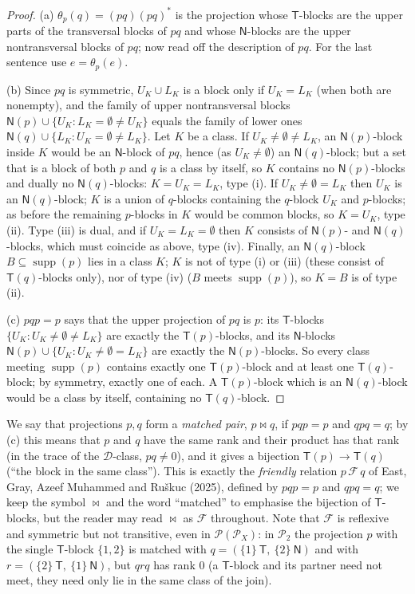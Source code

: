 \documentclass[11pt]{amsart}
\theoremstyle{definition}
\newcommand{\D}{\mathcal{D}}
\renewcommand{\P}{\mathcal{P}}
\newcommand{\supp}{\operatorname{supp}}
\newcommand{\T}{\mathsf{T}}
\newcommand{\N}{\mathsf{N}}
\begin{document}
\begin{proof}
(a) $\theta_p(q)=(pq)(pq)^*$ is the projection whose $\T$-blocks are the upper parts of the transversal blocks of $pq$ and whose $\N$-blocks are the upper nontransversal blocks of $pq$; now read off the description of $pq$. For the last sentence use $e=\theta_p(e)$.

(b) Since $pq$ is symmetric, $U_K\cup L_K$ is a block only if $U_K=L_K$ (when both are nonempty), and the family of upper nontransversal blocks $\N(p)\cup\{U_K:L_K=\emptyset\ne U_K\}$ equals the family of lower ones $\N(q)\cup\{L_K:U_K=\emptyset\ne L_K\}$. Let $K$ be a class. If $U_K\ne\emptyset\ne L_K$, an $\N(p)$-block inside $K$ would be an $\N$-block of $pq$, hence (as $U_K\neq\emptyset$) an $\N(q)$-block; but a set that is a block of both $p$ and $q$ is a class by itself, so $K$ contains no $\N(p)$-blocks and dually no $\N(q)$-blocks: $K=U_K=L_K$, type (i). If $U_K\ne\emptyset=L_K$ then $U_K$ is an $\N(q)$-block; $K$ is a union of $q$-blocks containing the $q$-block $U_K$ and $p$-blocks; as before the remaining $p$-blocks in $K$ would be common blocks, so $K=U_K$, type (ii). Type (iii) is dual, and if $U_K=L_K=\emptyset$ then $K$ consists of $\N(p)$- and $\N(q)$-blocks, which must coincide as above, type (iv). Finally, an $\N(q)$-block $B\subseteq\supp(p)$ lies in a class $K$; $K$ is not of type (i) or (iii) (these consist of $\T(q)$-blocks only), nor of type (iv) ($B$ meets $\supp(p)$), so $K=B$ is of type (ii).

(c) $pqp=p$ says that the upper projection of $pq$ is $p$: its $\T$-blocks $\{U_K: U_K\ne\emptyset\ne L_K\}$ are exactly the $\T(p)$-blocks, and its $\N$-blocks $\N(p)\cup\{U_K:U_K\ne\emptyset=L_K\}$ are exactly the $\N(p)$-blocks. So every class meeting $\supp(p)$ contains exactly one $\T(p)$-block and at least one $\T(q)$-block; by symmetry, exactly one of each. A $\T(p)$-block which is an $\N(q)$-block would be a class by itself, containing no $\T(q)$-block.
\end{proof}

We say that projections $p,q$ form a \emph{matched pair}, $p\bowtie q$, if $pqp=p$ and $qpq=q$; by (c) this means that $p$ and $q$ have the same rank and their product has that rank (in the trace of the $\D$-class, $pq\ne0$), and it gives a bijection $\T(p)\to\T(q)$ (``the block in the same class''). This is exactly the \emph{friendly} relation $p\,\mathcal F\,q$ of East, Gray, Azeef Muhammed and Ru\v skuc (2025), defined by $pqp=p$ and $qpq=q$; we keep the symbol $\bowtie$ and the word ``matched'' to emphasise the bijection of $\T$-blocks, but the reader may read $\bowtie$ as $\mathcal F$ throughout. Note that $\mathcal F$ is reflexive and symmetric but not transitive, even in $\P(\P_X)$: in $\P_2$ the projection $p$ with the single $\T$-block $\{1,2\}$ is matched with $q=(\{1\}\ \T,\ \{2\}\ \N)$ and with $r=(\{2\}\ \T,\ \{1\}\ \N)$, but $qrq$ has rank $0$ (a $\T$-block and its partner need not meet, they need only lie in the same class of the join).
\end{document}
